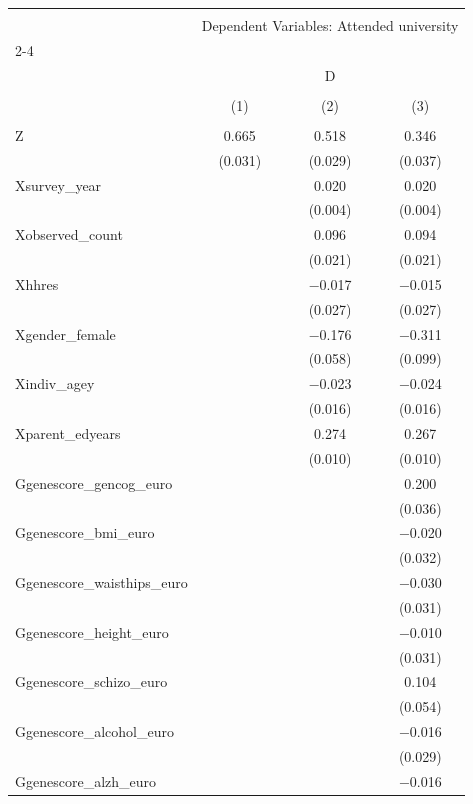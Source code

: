 
\begin{tabular}{@{\extracolsep{5pt}}lccc} 
\\[-1.8ex]\hline 
\hline \\[-1.8ex] 
 & \multicolumn{3}{c}{Dependent Variables: Attended university} \\ 
\cline{2-4} 
\\[-1.8ex] & \multicolumn{3}{c}{D} \\ 
\\[-1.8ex] & (1) & (2) & (3)\\ 
\hline \\[-1.8ex] 
 Z & 0.665 & 0.518 & 0.346 \\ 
  & (0.031) & (0.029) & (0.037) \\ 
  Xsurvey\_year &  & 0.020 & 0.020 \\ 
  &  & (0.004) & (0.004) \\ 
  Xobserved\_count &  & 0.096 & 0.094 \\ 
  &  & (0.021) & (0.021) \\ 
  Xhhres &  & $-$0.017 & $-$0.015 \\ 
  &  & (0.027) & (0.027) \\ 
  Xgender\_female &  & $-$0.176 & $-$0.311 \\ 
  &  & (0.058) & (0.099) \\ 
  Xindiv\_agey &  & $-$0.023 & $-$0.024 \\ 
  &  & (0.016) & (0.016) \\ 
  Xparent\_edyears &  & 0.274 & 0.267 \\ 
  &  & (0.010) & (0.010) \\ 
  Ggenescore\_gencog\_euro &  &  & 0.200 \\ 
  &  &  & (0.036) \\ 
  Ggenescore\_bmi\_euro &  &  & $-$0.020 \\ 
  &  &  & (0.032) \\ 
  Ggenescore\_waisthips\_euro &  &  & $-$0.030 \\ 
  &  &  & (0.031) \\ 
  Ggenescore\_height\_euro &  &  & $-$0.010 \\ 
  &  &  & (0.031) \\ 
  Ggenescore\_schizo\_euro &  &  & 0.104 \\ 
  &  &  & (0.054) \\ 
  Ggenescore\_alcohol\_euro &  &  & $-$0.016 \\ 
  &  &  & (0.029) \\ 
  Ggenescore\_alzh\_euro &  &  & $-$0.016 \\ 

\end{tabular}
